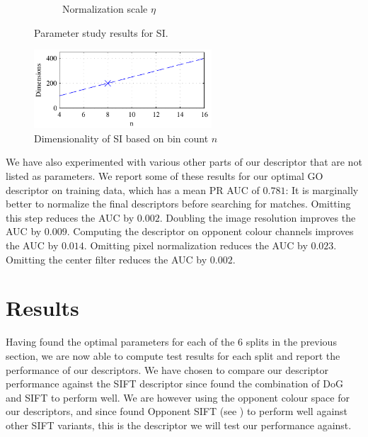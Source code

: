 \documentclass[thesis.tex]{subfiles}
\begin{document}
\begin{figure}[p]
{\begin{subfigure}[t]{0.593\textwidth}
		\caption{Normalization scale $\eta$}
		\label{fig:dtuParametersSi_normSigma}
		\vspace{2mm}
	\end{subfigure}}
	\caption{Parameter study results for SI.}
	\label{fig:dtuParametersSiAuc}
	\vspace{1cm}
	\includegraphics[width=0.593\textwidth]{img/dtuParametersSi_binCountDims.pdf}
	\caption{Dimensionality of SI based on bin count $n$}
	\label{fig:dtuParametersSiDims}
\end{figure}
%
%
We have also experimented with various other parts of our descriptor that are not listed as parameters. We report some of these results for our optimal GO descriptor on training data, which has a mean PR AUC of $0.781$: It is marginally better to normalize the final descriptors before searching for matches. Omitting this step reduces the AUC by $0.002$. Doubling the image resolution improves the AUC by $0.009$. Computing the descriptor on opponent colour channels improves the AUC by $0.014$. Omitting pixel normalization reduces the AUC by $0.023$. Omitting the center filter reduces the AUC by $0.002$.
%
\section{Results}
%
Having found the optimal parameters for each of the 6 splits in the previous section, we are now able to compute test results for each split and report the performance of our descriptors.
We have chosen to compare our descriptor performance against the SIFT descriptor since \citet{dahl2011finding} found the combination of DoG and SIFT to perform well. We are however using the opponent colour space for our descriptors, and since \citet{dahl2012interest} found Opponent SIFT (see ) to perform well against other SIFT variants, this is the descriptor we will test our performance against.
\end{document}

